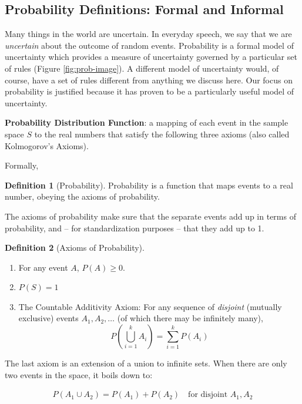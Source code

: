 \documentclass[
]{book}
\providecommand{\tightlist}{%
  \setlength{\itemsep}{0pt}\setlength{\parskip}{0pt}}
\theoremstyle{definition}
\newtheorem{definition}{Definition}[chapter]
\theoremstyle{definition}
\theoremstyle{definition}
\theoremstyle{remark}
\begin{document}
\hypertarget{probability-definitions-formal-and-informal}{%
\subsection*{Probability Definitions: Formal and Informal}\label{probability-definitions-formal-and-informal}}

Many things in the world are uncertain. In everyday speech, we say that we are \emph{uncertain} about the outcome of random events. Probability is a formal model of uncertainty which provides a measure of uncertainty governed by a particular set of rules (Figure \ref{fig:prob-image}). A different model of uncertainty would, of course, have a set of rules different from anything we discuss here. Our focus on probability is justified because it has proven to be a particularly useful model of uncertainty.

\textbf{Probability Distribution Function}: a mapping of each event in the sample space \(S\) to the real numbers that satisfy the following three axioms (also called Kolmogorov's Axioms).

Formally,

\begin{definition}[Probability]
\protect\hypertarget{def:unnamed-chunk-66}{}{\label{def:unnamed-chunk-66} {} }
Probability is a function that maps events to a real number, obeying the axioms of probability.
\end{definition}

The axioms of probability make sure that the separate events add up in terms of probability, and -- for standardization purposes -- that they add up to 1.

\begin{definition}[Axioms of Probability]
\protect\hypertarget{def:unnamed-chunk-67}{}{\label{def:unnamed-chunk-67} {} }

\begin{enumerate}
\def\labelenumi{\arabic{enumi}.}
\tightlist
\item
  For any event \(A\), \(P(A)\ge 0\).
\item
  \(P(S)=1\)
\item
  The Countable Additivity Axiom: For any sequence of \emph{disjoint} (mutually exclusive) events \(A_1,A_2,\ldots\) (of which there may be infinitely many), \[P\left( \bigcup\limits_{i=1}^k
  A_i\right)=\sum\limits_{i=1}^k P(A_i)\]
\end{enumerate}

The last axiom is an extension of a union to infinite sets. When there are only two events in the space, it boils down to:

\begin{align*}
P(A_1 \cup A_2) = P(A_1) + P(A_2) \quad\text{for disjoint } A_1, A_2
\end{align*}
\end{definition}
\end{document}
